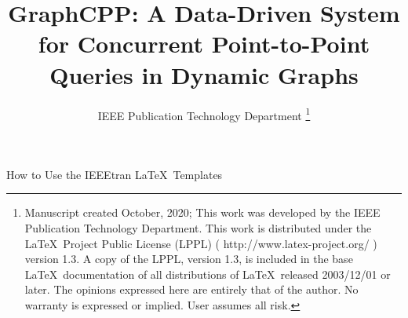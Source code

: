 \documentclass[lettersize,journal]{IEEEtran} %
\begin{document}
\title{GraphCPP: A Data-Driven System for Concurrent Point-to-Point Queries in Dynamic Graphs} %
\author{IEEE Publication Technology Department %
\thanks{Manuscript created October, 2020; This work was developed by the IEEE Publication Technology Department. This work is distributed under the \LaTeX \ Project Public License (LPPL) ( http://www.latex-project.org/ ) version 1.3. A copy of the LPPL, version 1.3, is included in the base \LaTeX \ documentation of all distributions of \LaTeX \ released 2003/12/01 or later. The opinions expressed here are entirely that of the author. No warranty is expressed or implied. User assumes all risk.}} %

{How to Use the IEEEtran \LaTeX \ Templates} 

\maketitle %

\graphicspath{{E:/华科实验室论文/MyDocument/并发点对点查询/论文草稿/picture/}}
\end{document}
